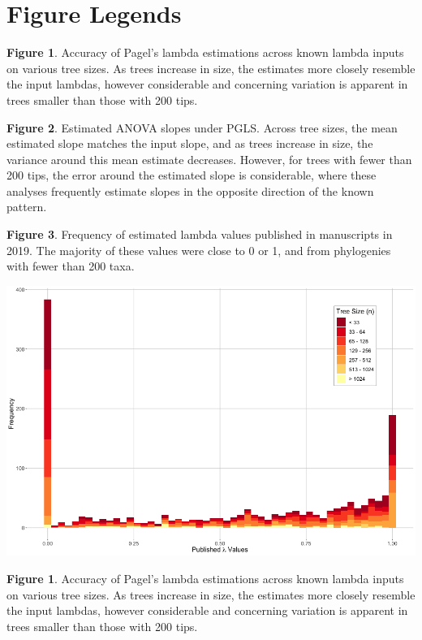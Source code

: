\documentclass[
]{article}
\begin{document}
\hypertarget{figure-legends}{%
\section{Figure Legends}\label{figure-legends}}

\textbf{Figure 1}. Accuracy of Pagel's lambda estimations across known
lambda inputs on various tree sizes. As trees increase in size, the
estimates more closely resemble the input lambdas, however considerable
and concerning variation is apparent in trees smaller than those with
200 tips. \hfill\break

\textbf{Figure 2}. Estimated ANOVA slopes under PGLS. Across tree sizes,
the mean estimated slope matches the input slope, and as trees increase
in size, the variance around this mean estimate decreases. However, for
trees with fewer than 200 tips, the error around the estimated slope is
considerable, where these analyses frequently estimate slopes in the
opposite direction of the known pattern. \hfill\break

\textbf{Figure 3}. Frequency of estimated lambda values published in
manuscripts in 2019. The majority of these values were close to 0 or 1,
and from phylogenies with fewer than 200 taxa.

\newpage

\includegraphics[width=0.95\linewidth]{Fig1}

\singlespacing \textbf{Figure 1}. Accuracy of Pagel's lambda estimations
across known lambda inputs on various tree sizes. As trees increase in
size, the estimates more closely resemble the input lambdas, however
considerable and concerning variation is apparent in trees smaller than
those with 200 tips. \hfill\break

\newpage
\end{document}
